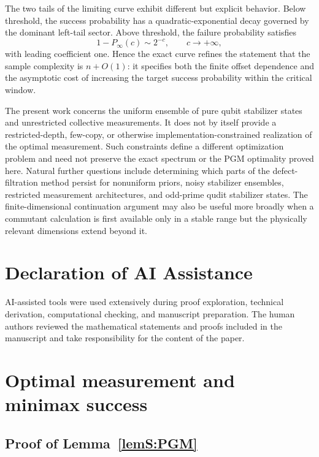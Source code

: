 \documentclass[journal,twocolumn]{IEEEtran}
\theoremstyle{definition}
\theoremstyle{plain}
\begin{document}
The two tails of the limiting curve exhibit different but explicit behavior.  Below threshold, the success probability has a quadratic-exponential decay governed by the dominant left-tail sector.  Above threshold, the failure probability satisfies
\[
  1-P_\infty(c)\sim 2^{-c},
  \qquad c\to+\infty,
\]
with leading coefficient one.  Hence the exact curve refines the statement that the sample complexity is $n+O(1)$: it specifies both the finite offset dependence and the asymptotic cost of increasing the target success probability within the critical window.

The present work concerns the uniform ensemble of pure qubit stabilizer states and unrestricted collective measurements.  It does not by itself provide a restricted-depth, few-copy, or otherwise implementation-constrained realization of the optimal measurement.  Such constraints define a different optimization problem and need not preserve the exact spectrum or the PGM optimality proved here.  Natural further questions include determining which parts of the defect-filtration method persist for nonuniform priors, noisy stabilizer ensembles, restricted measurement architectures, and odd-prime qudit stabilizer states.  The finite-dimensional continuation argument may also be useful more broadly when a commutant calculation is first available only in a stable range but the physically relevant dimensions extend beyond it.


\section*{Declaration of AI Assistance}
AI-assisted tools were used extensively during proof exploration, technical derivation, computational checking, and manuscript preparation. The human authors reviewed the mathematical statements and proofs included in the manuscript and take responsibility for the content of the paper. 


\clearpage
\onecolumn
\twocolumn
\appendices
\renewcommand{\thesubsection}{\thesection.\Roman{subsection}}
\renewcommand{\thesubsectiondis}{\appendixname~\thesubsection.}

\section{Optimal measurement and minimax success}
\label{app:measurement}

\subsection{Proof of Lemma~\ref{lemS:PGM}}
\label{app:proof-pgm}
\end{document}
